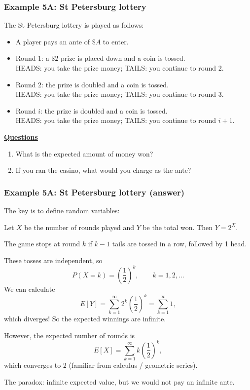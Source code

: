 \documentclass[t,8pt]{beamer}
\begin{document}

\begin{frame}
	\frametitle{Example 5A: St Petersburg lottery}
	The St Petersburg lottery is played as follows:
	\begin{itemize}
		\item A player pays an ante of $\$A$ to enter.
		\item Round 1: a $\$2$ prize is placed down and a coin is tossed.\\
		HEADS: you take the prize money; TAILS: you continue to round 2.
		\item Round 2: the prize is doubled and a coin is tossed.\\
		HEADS: you take the prize money; TAILS: you continue to round 3.
		\item Round $i$: the prize is doubled and a coin is tossed.\\
		HEADS: you take the prize money; TAILS: you continue to round $i+1$.
	\end{itemize}
	{\bf\underline{Questions}}
	\begin{enumerate}
		\item What is the expected amount of money won?
		\item If you ran the casino, what would you charge as the ante?
	\end{enumerate}
\end{frame}

\begin{frame}
	\frametitle{Example 5A: St Petersburg lottery (answer)}
	The key is to define random variables: \par
	Let $X$ be the number of rounds played and $Y$ be the total won. Then $Y=2^X$. \par
	The game stops at round $k$ if $k-1$ tails are tossed in a row, followed by 1 head. \par
	These tosses are independent, so
	\[
	P(X=k)=\left(\frac 12\right)^k,\qquad k=1,2,\dots
	\]
	We can calculate
	\[
	E[Y]=\sum_{k=1}^{\infty}2^k\left(\frac 12\right)^k=\sum_{k=1}^{\infty}1,
	\]
	which diverges! So the expected winnings are infinite. \par
	However, the expected number of rounds is
	\[
	E[X]=\sum_{k=1}^{\infty}k\left(\frac 12\right)^k,
	\]
	which converges to 2 (familiar from calculus / geometric series). \par
	{\small\color{NavyBlue} The paradox: infinite expected value, but we would not pay an infinite ante.}
\end{frame}
\end{document}
